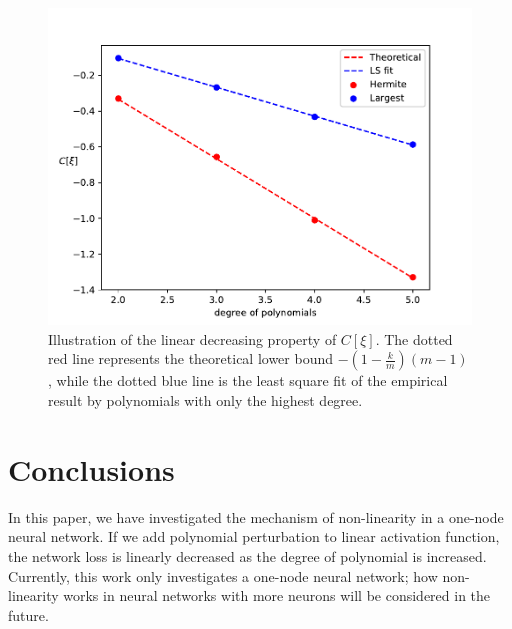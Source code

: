\documentclass[appliedmath,article,accept,pdftex,moreauthors]{Definitions/mdpi}
\begin{document}
\begin{figure}[H]
    \includegraphics[width=\linewidth]{fixed_nk.pdf}
    \caption{Illustration of the linear decreasing property of $C[\xi]$.
    The dotted red line represents the theoretical lower bound $-(1-\frac{k}{m})(m-1)$,
    while the dotted blue line is the least square fit of the empirical result by polynomials with only the highest degree.}\label{fig:fixednk}
\end{figure}


\section{Conclusions}\label{sec:con}

In this paper, we have investigated the mechanism of non-linearity in a one-node neural network.
If we add polynomial perturbation to linear activation function,
the network loss is linearly decreased as the degree of polynomial is increased.
Currently, this work only investigates a one-node neural network; how non-linearity works in  neural networks with more neurons will be considered in the future. 

\vspace{6pt} 

\end{document}
